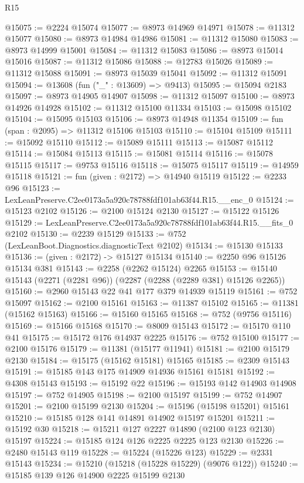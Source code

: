 \begin{lexlean}{R15}
\begin{coremodule}
@15075 := @2224 @15074
@15077 := @8973 @14969 @14971
@15078 := @11312 @15077
@15080 := @8973 @14984 @14986
@15081 := @11312 @15080
@15083 := @8973 @14999 @15001
@15084 := @11312 @15083
@15086 := @8973 @15014 @15016
@15087 := @11312 @15086
@15088 := @12783 @15026
@15089 := @11312 @15088
@15091 := @8973 @15039 @15041
@15092 := @11312 @15091
@15094 := @13608 (fun ("_" : @13609) => @9413)
@15095 := @15094 @2183
@15097 := @8973 @14905 @14907
@15098 := @11312 @15097
@15100 := @8973 @14926 @14928
@15102 := @11312 @15100 @11334
@15103 := @15098 @15102
@15104 := @15095 @15103
@15106 := @8973 @14948 @11354
@15109 := fun (span : @2095) => @11312 @15106 @15103
@15110 := @15104 @15109
@15111 := @15092 @15110
@15112 := @15089 @15111
@15113 := @15087 @15112
@15114 := @15084 @15113
@15115 := @15081 @15114
@15116 := @15078 @15115
@15117 := @9753 @15116
@15118 := @15075 @15117
@15119 := @14959 @15118
@15121 := fun (given : @2172) => @14940 @15119
@15122 := @2233 @96
@15123 := LexLeanPreserve.C2ee0173a5a920c78788fdf101ab63f44.R15.__enc_0
@15124 := @15123 @2102
@15126 := @2100 @15124 @2130
@15127 := @15122 @15126
@15129 := LexLeanPreserve.C2ee0173a5a920c78788fdf101ab63f44.R15.__fits_0 @2102
@15130 := @2239 @15129
@15133 := @752 (LexLeanBoot.Diagnostics.diagnosticText @2102)
@15134 := @15130 @15133
@15136 := (given : @2172) -> @15127 @15134
@15140 := @2250 @96 @15126 @15134 @381
@15143 := @2258 (@2262 @15124) @2265
@15153 := @15140 @15143 (@2271 (@2281 @96)) (@2287 (@2288 (@2289 @381) @15126 @2265))
@15160 := @2960 @15143 @22 @41 @177 @379 @14939 @15119
@15161 := @752 @15097
@15162 := @2100 @15161
@15163 := @11387 @15102
@15165 := @11381 (@15162 @15163)
@15166 := @15160 @15165
@15168 := @752 (@9756 @15116)
@15169 := @15166 @15168
@15170 := @8009 @15143
@15172 := @15170 @110 @41
@15175 := @15172 @176 @14937 @2225
@15176 := @752 @15100
@15177 := @2100 @15176
@15179 := @11381 (@15177 @11941)
@15181 := @2100 @15179 @2130
@15184 := @15175 (@15162 @15181) @15165
@15185 := @2309 @15143
@15191 := @15185 @143 @175 @14909 @14936 @15161 @15181
@15192 := @4308 @15143
@15193 := @15192 @22
@15196 := @15193 @142 @14903 @14908
@15197 := @752 @14905
@15198 := @2100 @15197
@15199 := @752 @14907
@15201 := @2100 @15199 @2130
@15204 := @15196 (@15198 @15201) @15161
@15210 := @15185 @128 @141 @14891 @14902 @15197 @15201
@15211 := @15192 @30
@15218 := @15211 @127 @2227 @14890 (@2100 @123 @2130) @15197
@15224 := @15185 @124 @126 @2225 @2225 @123 @2130
@15226 := @2480 @15143 @119
@15228 := @15224 (@15226 @123)
@15229 := @2331 @15143
@15234 := @15210 (@15218 (@15228 @15229) (@9076 @122))
@15240 := @15185 @139 @126 @14900 @2225 @15199 @2130

\end{coremodule}
\end{lexlean}
